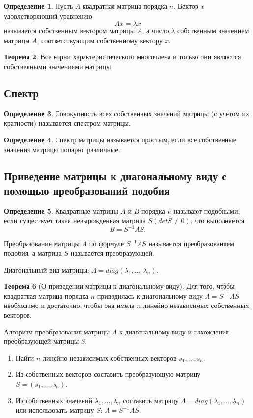 \documentclass[12pt]{report}
\theoremstyle{definition}
\newtheorem{theorem}{Теорема}[chapter]
\newtheorem{definition}[theorem]{Определение}
\begin{document}
\begin{definition}
Пусть $A$ квадратная матрица порядка $n$. Вектор $x$ удовлетворяющий
уравнению
$$
Ax = \lambda x
$$
называется собственным вектором матрицы $A$, а число $\lambda$ собственным
значением матрицы $A$, соответствующим собственному вектору $x$.
\end{definition}

\begin{theorem}
Все корни характеристического многочлена и только они являются собственными
значениями матрицы.
\end{theorem}

\subsection{Спектр}
\begin{definition}
Совокупность всех собственных значений матрицы (с учетом их кратности)
называется спектром матрицы.
\end{definition}

\begin{definition}
Спектр матрицы называется простым, если все собственные значения матрицы
попарно различные.
\end{definition}

\subsection{Приведение матрицы к диагональному виду с помощью преобразований подобия}
\begin{definition}
Квадратные матрицы $A$ и $B$ порядка $n$ называют подобными,
если существует такая невырожденная матрица $S (det S \ne 0)$, что выполняется
$$
B = S^{-1} A S.
$$
\end{definition}

Преобразование матрицы $A$ по формуле $S^{-1} A S$ называется преобразованием подобия,
а матрица $S$ называется преобразующей.

Диагональный вид матрицы: $\Lambda = diag(\lambda_1, \dots, \lambda_n)$.

\begin{theorem}[О приведении матрицы к диагональному виду]
Для того, чтобы квадратная матрица порядка $n$ приводилась
к диагональному виду $\Lambda = S^{-1} A S$ необходимо и достаточно,
чтобы она имела $n$ линейно независимых собственных векторов.
\end{theorem}

Алгоритм преобразования матрицы $A$ к диагональному виду и нахождения
преобразующей матрицы $S$:
\begin{enumerate}
\item Найти $n$ линейно независимых собственных векторов $s_1, \dots, s_n$.
\item Из собственных векторов составить преобразующую матрицу $S = (s_1, \dots, s_n)$.
\item Из собственных значений $\lambda_1, \dots, \lambda_n$ составить матрицу
  $\Lambda = diag(\lambda_1, \dots, \lambda_n)$ или использовать матрицу $S$:
  $\Lambda = S^{-1} A S$.
\end{enumerate}
\end{document}
